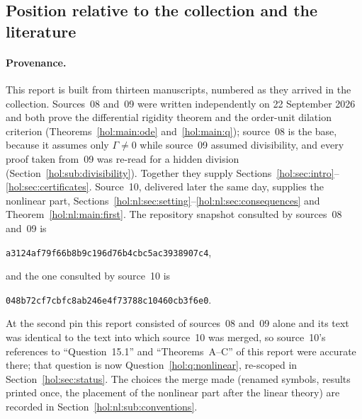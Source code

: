 \documentclass[11pt]{article}
\numberwithin{equation}{section}
\theoremstyle{definition}
\theoremstyle{remark}
\begin{document}
\subsection{Position relative to the collection and the literature}
\label{hol:sub:position}

\paragraph{Provenance.}
This report is built from thirteen manuscripts, numbered as they arrived in
the collection. Sources~08 and~09 were written independently on 22 September 2026
and both prove the differential rigidity theorem and the order-unit dilation
criterion (Theorems~\ref{hol:main:ode} and~\ref{hol:main:q}); source~08 is
the base, because it assumes only $\Gamma\ne0$ while source~09 assumed
divisibility, and every proof taken from~09 was re-read for a hidden division
(Section~\ref{hol:sub:divisibility}). Together they supply
Sections~\ref{hol:sec:intro}--\ref{hol:sec:certificates}. Source~10, delivered
later the same day, supplies the nonlinear part,
Sections~\ref{hol:nl:sec:setting}--\ref{hol:nl:sec:consequences} and
Theorem~\ref{hol:nl:main:first}. The repository snapshot consulted by
sources~08 and~09 is
\begin{center}\small\texttt{a3124af79f66b8b9c196d76b4cbc5ac3938907c4},\end{center}
and the one consulted by source~10 is
\begin{center}\small\texttt{048b72cf7cbfc8ab246e4f73788c10460cb3f6e0}.\end{center}
At the second pin this report consisted of sources~08 and~09 alone and its text
was identical to the text into which source~10 was merged, so source~10's
references to ``Question~15.1'' and ``Theorems~A--C'' of this report were
accurate there; that question is now Question~\ref{hol:q:nonlinear}, re-scoped
in Section~\ref{hol:sec:status}. The choices the merge made (renamed symbols,
results printed once, the placement of the nonlinear part after the linear
theory) are recorded in Section~\ref{hol:nl:sub:conventions}.
\end{document}
